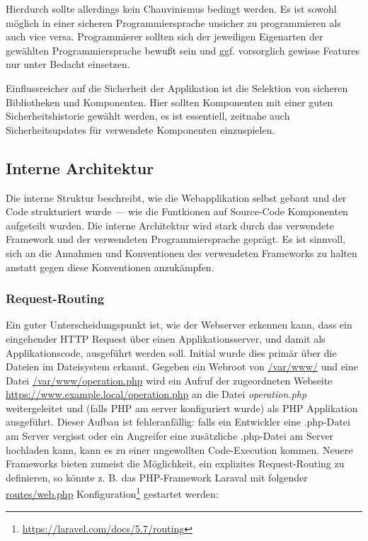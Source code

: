 Hierdurch sollte allerdings kein Chauvinismus bedingt werden. Es ist sowohl möglich in einer sicheren Programmiersprache unsicher zu programmieren als auch vice versa. Programmierer sollten sich der jeweiligen Eigenarten der gewählten Programmiersprache bewußt sein und ggf. vorsorglich gewisse Features nur unter Bedacht einsetzen.

Einflussreicher auf die Sicherheit der Applikation ist die Selektion von sicheren Bibliotheken und Komponenten. Hier sollten Komponenten mit einer guten Sicherheitshistorie gewählt werden, es ist essentiell, zeitnahe auch Sicherheitsupdates für verwendete Komponenten einzuspielen.

\subsection{Interne Architektur}

Die interne Struktur beschreibt, wie die Webapplikation selbst gebaut und der Code strukturiert wurde --- wie die Funtkionen auf Source-Code Komponenten aufgeteilt wurden. Die interne Architektur wird stark durch das verwendete Framework und der verwendeten Programmiersprache geprägt. Es ist sinnvoll, sich an die Annahmen und Konventionen des verwendeten Frameworks zu halten anstatt gegen diese Konventionen anzukämpfen.

\subsubsection{Request-Routing}

Ein guter Unterscheidungspunkt ist, wie der Webserver erkennen kann, dass ein eingehender HTTP Request über einen Applikationsserver, und damit als Applikationscode, ausgeführt werden soll. Initial wurde dies primär über die Dateien im Dateisystem erkannt. Gegeben ein Webroot von \url{/var/www/} und eine Datei \url{/var/www/operation.php} wird ein Aufruf der zugeordneten Webseite \url{https://www.example.local/operation.php} an die Datei \textit{operation.php} weitergeleitet und (falls PHP am server konfiguriert wurde) als PHP Applikation ausgeführt. Dieser Aufbau ist fehleranfällig: falls ein Entwickler eine .php-Datei am Server vergisst oder ein Angreifer eine zusätzliche .php-Datei am Server hochladen kann, kann es zu einer ungewollten Code-Execution kommen. Neuere Frameworks bieten zumeist die Möglichkeit, ein explizites Request-Routing zu definieren, so könnte z. B. das PHP-Framework Laraval mit folgender \url{routes/web.php} Konfiguration\footnote{\url{https://laravel.com/docs/5.7/routing}} gestartet werden:

